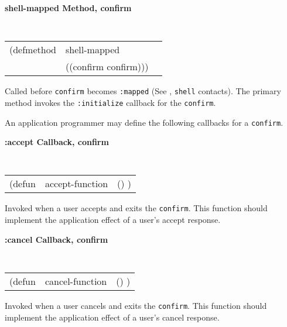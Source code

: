 {\samepage
{\large {\bf shell-mapped \hfill Method, confirm}}
\begin{flushright} \parbox[t]{6.125in}{
\tt
\begin{tabular}{lll}
\raggedright
(defmethod & shell-mapped & \\
& ((confirm  confirm)))
\end{tabular}
\rm

}\end{flushright}}


\begin{flushright} \parbox[t]{6.125in}{ Called before {\tt confirm} becomes
{\tt :mapped} (See \cite{clue}, {\tt shell} contacts).  The primary
method
invokes the {\tt :initialize} callback for the {\tt confirm}.
}\end{flushright}







An application programmer may define the following callbacks for
a {\tt confirm}.

{\samepage
{\large {\bf :accept \hfill Callback, confirm}} 
\begin{flushright} 
\parbox[t]{6.125in}{
\tt
\begin{tabular}{lll}
\raggedright
(defun & accept-function & () )
\end{tabular}
\rm

}\end{flushright}}

\begin{flushright} \parbox[t]{6.125in}{
Invoked when a user accepts and exits the {\tt confirm}. 
This function should implement the application effect of a user's accept
response.

}\end{flushright}

{\samepage
{\large {\bf :cancel \hfill Callback, confirm}} 
\begin{flushright} 
\parbox[t]{6.125in}{
\tt
\begin{tabular}{lll}
\raggedright
(defun & cancel-function & () )
\end{tabular}
\rm

}\end{flushright}}

\begin{flushright} \parbox[t]{6.125in}{
Invoked when a user cancels and exits the {\tt confirm}. 
This function should implement the application effect of a user's cancel
response.

}\end{flushright}

